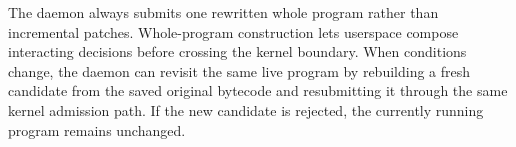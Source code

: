 The daemon always submits one rewritten whole program rather than incremental patches. Whole-program construction lets userspace compose interacting decisions before crossing the kernel boundary. When conditions change, the daemon can revisit the same live program by rebuilding a fresh candidate from the saved original bytecode and resubmitting it through the same kernel admission path. If the new candidate is rejected, the currently running program remains unchanged.
